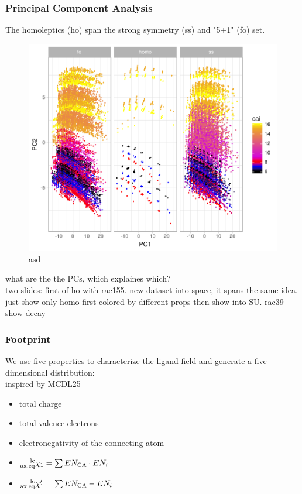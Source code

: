 \documentclass[xcolor=dvipsnames]{beamer}
\begin{document}
\begin{frame}
\frametitle{Principal Component Analysis}
The homoleptics (ho) span the strong symmetry (ss) and "5+1" (fo) set.
\begin{figure}
\includegraphics[width=0.65\linewidth]{img/pca.pdf}
\caption{asd} 
\end{figure}
what are the the PCs, which explaines which?\\
two slides: first of ho with rac155. new dataset into space, it spans the same idea.\\
just show only homo first colored by different props then show into SU. rac39 \\
show decay
\end{frame}

\begin{frame}
	\frametitle{Footprint}
	We use five properties to characterize the ligand field and generate a five dimensional distribution:\\
	inspired by MCDL25\\
	\begin{itemize}
	\item total charge
	\item total valence electrons
	\item electronegativity of the connecting atom
	\item $\prescript{\textrm{lc}}{\textrm{ax,eq}}{\chi}_1 = \sum{EN_{\textrm{CA}} \cdot EN_i}$
	\item $\prescript{\textrm{lc}}{\textrm{ax,eq}}{\chi}^{\prime}_1 = \sum{EN_{\textrm{CA}} - EN_i}$
	\end{itemize}
\end{frame}
\end{document}
